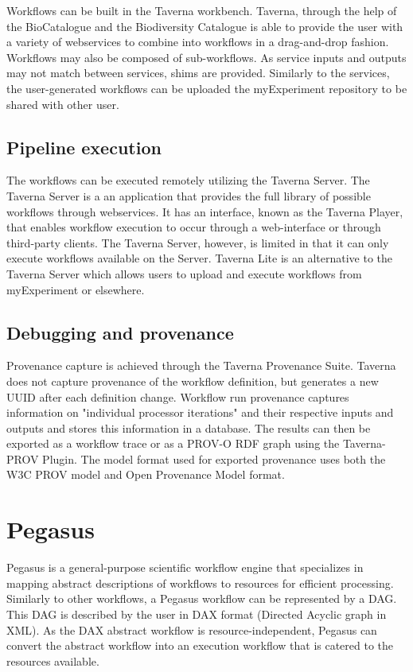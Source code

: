 \documentclass{report}
\begin{document}
        Workflows can be built in the Taverna workbench. Taverna, through the help of the BioCatalogue and the Biodiversity Catalogue is
        able to provide the user with a variety of webservices to combine into workflows in a drag-and-drop fashion. Workflows may also be composed
        of sub-workflows. As service inputs and outputs may not match between services, shims are provided.
        Similarly to the services, the user-generated workflows can be uploaded the myExperiment repository to be shared with other user.
        
        \subsection{Pipeline execution}
        The workflows can be executed remotely utilizing the Taverna Server. The Taverna Server is a an application that provides the full library of possible workflows
        through webservices. It has an interface, known as the Taverna Player, that enables workflow execution to occur through a web-interface or through
        third-party clients. The Taverna Server, however, is limited in that it can only execute workflows available on the Server. Taverna Lite is an alternative to
        the Taverna Server which allows users to upload and execute workflows from myExperiment or elsewhere.   
        
        \subsection{Debugging and provenance}
         Provenance capture is achieved through the Taverna Provenance Suite. Taverna does not capture provenance of the workflow definition, but generates a new
        UUID after each definition change. Workflow run provenance captures information on "individual processor iterations" and their respective inputs and outputs and
        stores this information in a database. The results can then be exported as a workflow trace or as a PROV-O RDF graph using the Taverna-PROV Plugin. The model format used
        for exported provenance uses both the W3C PROV model and Open Provenance Model format.
        
    \section{Pegasus}
        Pegasus is a general-purpose scientific workflow engine that specializes in mapping abstract descriptions of workflows to resources for efficient processing. 
        Similarly to other workflows, a Pegasus workflow can be represented by a DAG. This DAG is described by the user in DAX format (Directed Acyclic graph in XML).
        As the DAX abstract workflow is resource-independent, Pegasus can convert the abstract workflow into an execution workflow that is catered to the resources available.        
\end{document}

